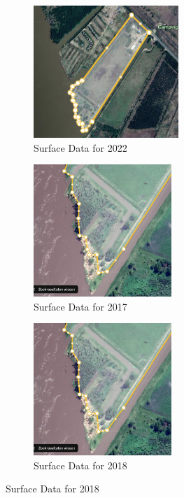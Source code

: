 \begin{figure}[H]
    \centering
    \begin{subfigure}[b]{0.45\textwidth} %
        \includegraphics[width=\linewidth, height=5cm]{figures/appendix-g/opp2022.png}
        \caption{Surface Data for 2022}
        \label{fig:surface2022.2}
    \end{subfigure}
    \hfill
    \begin{subfigure}[b]{0.45\textwidth} %
        \includegraphics[width=\linewidth, height=5cm]{figures/appendix-g/opp2017.png}
        \caption{Surface Data for 2017}
        \label{fig:surface2017}
    \end{subfigure}
    \hfill
    \begin{subfigure}[b]{0.45\textwidth} %
        \includegraphics[width=\linewidth, height=5cm]{figures/appendix-g/opp2018.png}
        \caption{Surface Data for 2018}
        \label{fig:surface2018}
    \end{subfigure}

\end{figure}
